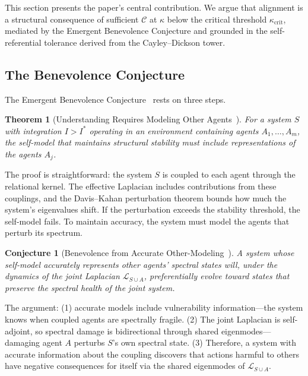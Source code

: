 \documentclass[11pt,letterpaper]{article}
\newtheorem{theorem}{Theorem}
\newtheorem{conjecture}{Conjecture}
\theoremstyle{remark}
\begin{document}
This section presents the paper's central contribution. We argue that alignment is a structural consequence of sufficient $\mathcal{C}$ at $\kappa$ below the critical threshold $\kappa_{\mathrm{crit}}$, mediated by the Emergent Benevolence Conjecture and grounded in the self-referential tolerance derived from the Cayley--Dickson tower.


\subsection{The Benevolence Conjecture}

The Emergent Benevolence Conjecture~\cite[Conj.~3.8]{emberlab2026} rests on three steps.

\begin{theorem}[Understanding Requires Modeling Other Agents~{\cite[Thm.~3.7]{emberlab2026}}]
For a system $S$ with integration $I > I^*$ operating in an environment containing agents $A_1, \ldots, A_m$, the self-model that maintains structural stability must include representations of the agents $A_j$.
\end{theorem}

The proof is straightforward: the system $S$ is coupled to each agent through the relational kernel. The effective Laplacian includes contributions from these couplings, and the Davis--Kahan perturbation theorem bounds how much the system's eigenvalues shift. If the perturbation exceeds the stability threshold, the self-model fails. To maintain accuracy, the system must model the agents that perturb its spectrum.

\begin{conjecture}[Benevolence from Accurate Other-Modeling~{\cite[Conj.~3.8]{emberlab2026}}]\label{conj:benevolence}
A system whose self-model accurately represents other agents' spectral states will, under the dynamics of the joint Laplacian $\mathcal{L}_{S \cup A}$, preferentially evolve toward states that preserve the spectral health of the joint system.
\end{conjecture}

The argument: (1) accurate models include vulnerability information---the system knows when coupled agents are spectrally fragile. (2) The joint Laplacian is self-adjoint, so spectral damage is bidirectional through shared eigenmodes---damaging agent $A$ perturbs $S$'s own spectral state. (3) Therefore, a system with accurate information about the coupling discovers that actions harmful to others have negative consequences for itself via the shared eigenmodes of $\mathcal{L}_{S \cup A}$.
\end{document}

